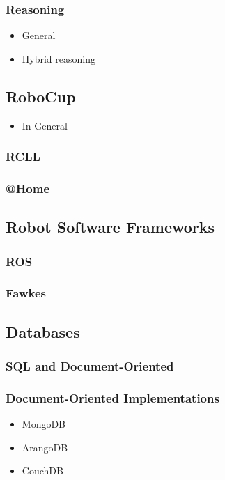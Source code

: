 \documentclass[a4paper,11pt]{article}
\begin{document}
\subsubsection{Reasoning}
\begin{itemize}
\item General
\item Hybrid reasoning
\end{itemize}

\subsection{RoboCup}
\begin{itemize}
\item In General
\end{itemize}
\subsubsection{RCLL}
\subsubsection{@Home}

\subsection{Robot Software Frameworks}
\subsubsection{ROS}
\subsubsection{Fawkes}

\subsection{Databases}
\subsubsection{SQL and Document-Oriented}
\subsubsection{Document-Oriented Implementations}
\begin{itemize}
\item MongoDB
\item ArangoDB
\item CouchDB
\end{itemize}
\end{document}
